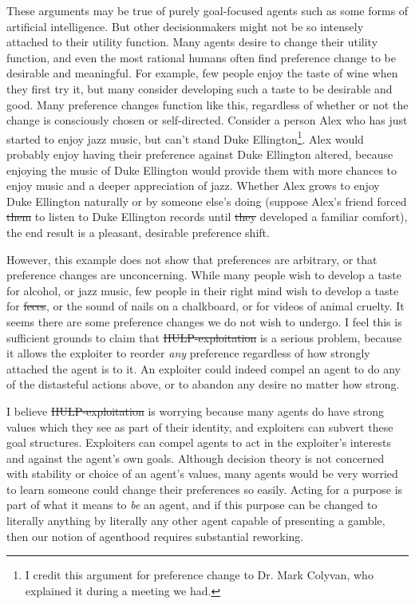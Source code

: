 \documentclass{article}
\providecommand{\DIFadd}[1]{{\protect\color{blue}\uwave{#1}}} %
\providecommand{\DIFdel}[1]{{\protect\color{red}\sout{#1}}}                      %
\providecommand{\DIFaddbegin}{} %
\providecommand{\DIFaddend}{} %
\providecommand{\DIFdelbegin}{} %
\providecommand{\DIFdelend}{} %
\begin{document}
\DIFaddend These arguments may be true of purely goal-focused agents such as some forms of artificial intelligence. But other decisionmakers might not be so intensely attached to their utility function. Many agents desire to change their utility function, and even the most rational humans often find preference change to be desirable and meaningful. For example, few people enjoy the taste of wine when they first try it, but many consider developing such a taste to be desirable and good. Many preference changes function like this, regardless of whether or not the change is consciously chosen or self-directed. Consider a person Alex who has just started to enjoy jazz music, but can't stand Duke Ellington\footnote{I credit this argument for preference change to Dr. Mark Colyvan, who explained it during a meeting we had.}. Alex would probably enjoy having their preference against Duke Ellington altered, because enjoying the music of Duke Ellington would provide them with more chances to enjoy music and a deeper appreciation of jazz. Whether Alex grows to enjoy Duke Ellington naturally or by someone else's doing (suppose Alex's friend forced \DIFdelbegin \DIFdel{them }\DIFdelend \DIFaddbegin \DIFadd{him or her }\DIFaddend to listen to Duke Ellington records until \DIFdelbegin \DIFdel{they }\DIFdelend \DIFaddbegin \DIFadd{he or she }\DIFaddend developed a familiar comfort), the end result is a pleasant, desirable preference shift.

However, this example does not show that preferences are arbitrary, or that preference changes are unconcerning. While many people wish to develop a taste for alcohol, or jazz music, few people in their right mind wish to develop a taste for \DIFdelbegin \DIFdel{feces}\DIFdelend \DIFaddbegin \DIFadd{faeces}\DIFaddend , or the sound of nails on a chalkboard, or for videos of animal cruelty. It seems there are some preference changes we do not wish to undergo. I feel this is sufficient grounds to claim that \DIFdelbegin \DIFdel{HULP-exploitation }\DIFdelend \DIFaddbegin \DIFadd{HULP exploitation }\DIFaddend is a serious problem, because it allows the exploiter to reorder \textit{any} preference regardless of how strongly attached the agent is to it. An exploiter could indeed compel an agent to do any of the distasteful actions above, or to abandon any desire no matter how strong.

I believe \DIFdelbegin \DIFdel{HULP-exploitation }\DIFdelend \DIFaddbegin \DIFadd{HULP exploitation }\DIFaddend is worrying because many agents do have strong values which they see as part of their identity, and exploiters can subvert these goal structures. Exploiters can compel agents to act in the exploiter's interests and against the agent's own goals. Although decision theory is not concerned with stability or choice of an agent's values, many agents would be very worried to learn someone could change their preferences so easily. Acting for a purpose is part of what it means to \textit{be} an agent, and if this purpose can be changed to literally anything by literally any other agent capable of presenting a gamble, then our notion of agenthood requires substantial reworking.
\end{document}
